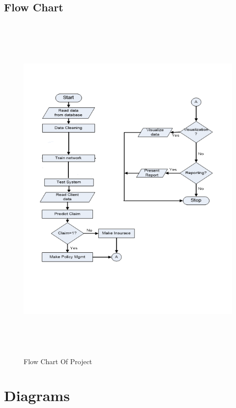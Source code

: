 \subsection{Flow Chart}
\begin{figure}[tbh] %
\begin{center}
	\includegraphics[height=7in]{images/systemflow.png}
	\caption{Flow Chart Of Project} %
	
	\label{Flow Chart} %
\end{center}
\end{figure}
\newpage

\section{Diagrams}
